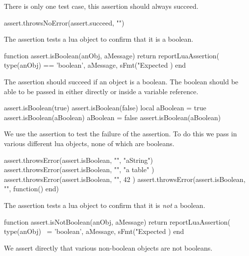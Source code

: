 There is only one test case, this assertion should always succeed. 

\startLuaTest
  assert.throwsNoError(assert.succeed, "")
\stopLuaTest
\stopTestCase

\stopTestSuite


The  assertion tests a lua object to confirm that 
it is a boolean. 

\startLuaCode
function assert.isBoolean(anObj, aMessage)
  return reportLuaAssertion(
    type(anObj) == 'boolean',
    aMessage,
    sFmt("Expected %
  )
end
\stopLuaCode


The  assertion should succeed if an object is a 
boolean. The boolean should be able to be passed in either directly or 
inside a variable reference. 

\startLuaTest
  assert.isBoolean(true)
  assert.isBoolean(false)
  local aBoolean = true
  assert.isBoolean(aBoolean)
  aBoolean = false
  assert.isBoolean(aBoolean)
\stopLuaTest
\stopTestCase


We use the  assertion to test the failure of the 
 assertion. To do this we pass in various different 
lua objects, none of which are booleans. 

\startLuaTest
  assert.throwsError(assert.isBoolean, "", "aString")
  assert.throwsError(assert.isBoolean, "", { "a table" })
  assert.throwsError(assert.isBoolean, "", 42 )
  assert.throwsError(assert.isBoolean, "", function() end)
\stopLuaTest
\stopTestCase

\stopTestSuite


The  assertion tests a lua object to confirm 
that it is \emph{not} a boolean. 

\startLuaCode
function assert.isNotBoolean(anObj, aMessage)
  return reportLuaAssertion(
    type(anObj) ~= 'boolean',
    aMessage,
    sFmt("Expected %
  )
end
\stopLuaCode


We assert directly that various non-boolean objects are not booleans. 

